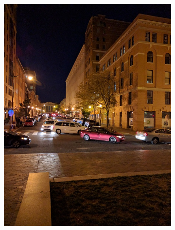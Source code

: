 \documentclass[12pt]{article}
\begin{document}
\begin{figure}[t!]
\begin{subfigure}[t]{0.3\textwidth}
        \includegraphics[width=\linewidth]{../Images/CustomSet2/2}
    \end{subfigure}
    \begin{subfigure}[t]{0.3\textwidth}
        \centering

\end{subfigure}
\end{figure}
\end{document}
